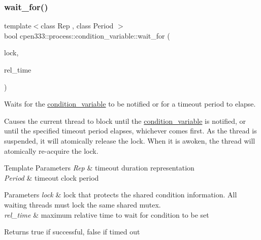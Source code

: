 \subsubsection{\texorpdfstring{wait\+\_\+for()}{wait\_for()}\hspace{0.1cm}{\footnotesize\ttfamily [1/2]}}
{\footnotesize\ttfamily template$<$class Rep , class Period $>$ \\
bool cpen333\+::process\+::condition\+\_\+variable\+::wait\+\_\+for (\begin{DoxyParamCaption}\item[{std\+::unique\+\_\+lock$<$ \hyperlink{classcpen333_1_1process_1_1mutex}{cpen333\+::process\+::mutex} $>$ \&}]{lock,  }\item[{const std\+::chrono\+::duration$<$ Rep, Period $>$ \&}]{rel\+\_\+time }\end{DoxyParamCaption})\hspace{0.3cm}{\ttfamily [inline]}}



Waits for the \hyperlink{classcpen333_1_1process_1_1condition__variable}{condition\+\_\+variable} to be notified or for a timeout period to elapse. 

Causes the current thread to block until the \hyperlink{classcpen333_1_1process_1_1condition__variable}{condition\+\_\+variable} is notified, or until the specified timeout period elapses, whichever comes first. As the thread is suspended, it will atomically release the lock. When it is awoken, the thread will atomically re-\/acquire the lock.


\begin{DoxyTemplParams}{Template Parameters}
{\em Rep} & timeout duration representation \\
\hline
{\em Period} & timeout clock period \\
\hline
\end{DoxyTemplParams}

\begin{DoxyParams}{Parameters}
{\em lock} & lock that protects the shared condition information. All waiting threads must lock the same shared mutex. \\
\hline
{\em rel\+\_\+time} & maximum relative time to wait for condition to be set \\
\hline
\end{DoxyParams}
\begin{DoxyReturn}{Returns}
true if successful, false if timed out 
\end{DoxyReturn}
\mbox{\label{classcpen333_1_1process_1_1condition__variable_af610e3f28f9c5ea4c24b35cca125ff45}} 
